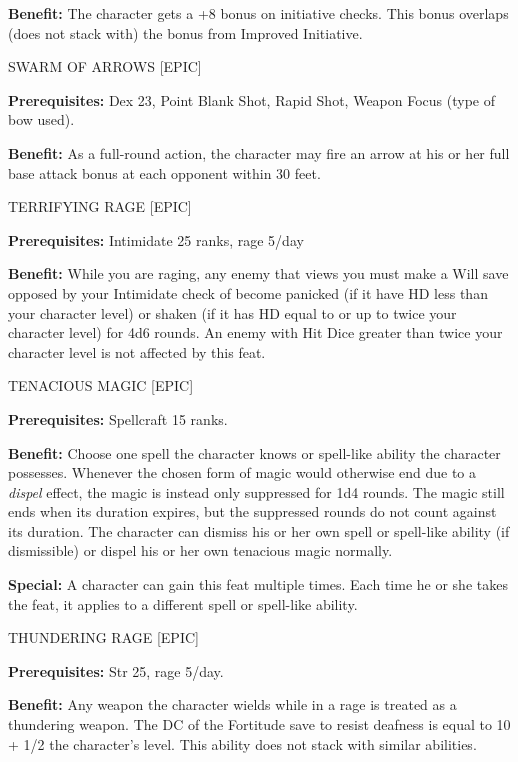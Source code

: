 \documentclass{article}
\begin{document}
\textbf{Benefit:} The character gets a +8 bonus on initiative checks. This bonus 
overlaps (does not stack with) the bonus from Improved Initiative. 

\vspace{12pt}
SWARM OF ARROWS [EPIC]

\textbf{Prerequisites:} Dex 23, Point Blank Shot, Rapid Shot, Weapon Focus (type 
of bow used). 

\textbf{Benefit:} As a full-round action, the character may fire an arrow at his 
or her full base attack bonus at each opponent within 30 feet. 

\vspace{12pt}
TERRIFYING RAGE [EPIC]

\textbf{Prerequisites:} Intimidate 25 ranks, rage 5/day

\textbf{Benefit:} While you are raging, any enemy that views you must make a Will 
save opposed by your Intimidate check of become panicked (if it have HD less than 
your character level) or shaken (if it has HD equal to or up to twice your character 
level) for 4d6 rounds.  An enemy with Hit Dice greater than twice your character 
level is not affected by this feat.

\vspace{12pt}
TENACIOUS MAGIC [EPIC] 

\textbf{Prerequisites:} Spellcraft 15 ranks. 

\textbf{Benefit:} Choose one spell the character knows or spell-like ability the 
character possesses. Whenever the chosen form of magic would otherwise end due 
to a \textit{dispel }effect, the magic is instead only suppressed for 1d4 rounds. 
The magic still ends when its duration expires, but the suppressed rounds do not 
count against its duration. The character can dismiss his or her own spell or spell-like 
ability (if dismissible) or dispel his or her own tenacious magic normally. 

\textbf{Special:} A character can gain this feat multiple times. Each time he or 
she takes the feat, it applies to a different spell or spell-like ability. 

\vspace{12pt}
THUNDERING RAGE [EPIC] 

\textbf{Prerequisites:} Str 25, rage 5/day. 

\textbf{Benefit:} Any weapon the character wields while in a rage is treated as 
a thundering weapon. The DC of the Fortitude save to resist deafness is equal to 
10 + 1/2 the character's level. This ability does not stack with similar abilities. 
\end{document}

